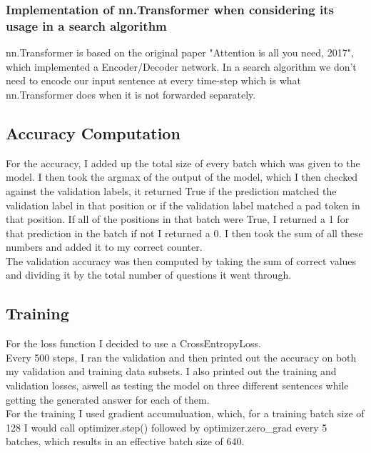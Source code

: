 \documentclass{article}
\begin{document}
\subsubsection{Implementation of nn.Transformer when considering its usage in a search algorithm}
nn.Transformer is based on the original paper "Attention is all you need, 2017", which implemented a Encoder/Decoder network. In a search algorithm we don't need to encode our input sentence at every time-step which is what nn.Transformer does when it is not forwarded separately.
\subsection{Accuracy Computation}
For the accuracy, I added up the total size of every batch which was given to the model. I then took the argmax of the output of the model, which I then checked against the validation labels, it returned True if the prediction matched the validation label in that position or if the validation label matched a pad token in that position. If all of the positions in that batch were True, I returned a 1 for that prediction in the batch if not I returned a 0. I then took the sum of all these numbers and added it to my correct counter.\\
The validation accuracy was then computed by taking the sum of correct values and dividing it by the total number of questions it went through.
\subsection{Training}
For the loss function I decided to use a CrossEntropyLoss.\\
Every 500 steps, I ran the validation and then printed out the accuracy on both my validation and training data subsets. I also printed out the training and validation losses, aswell as testing the model on three different sentences while getting the generated answer for each of them.\\
For the training I used gradient accumuluation, which, for a training batch size of 128 I would call optimizer.step() followed by optimizer.zero\_grad every 5 batches, which results in an effective batch size of 640.
\clearpage
\end{document}
